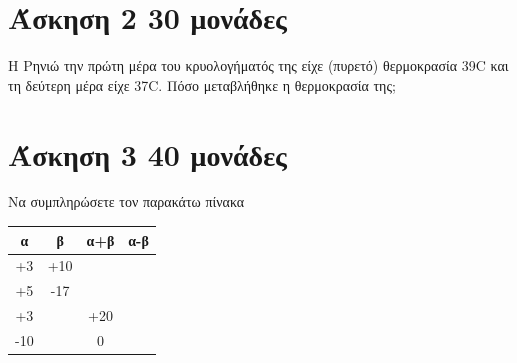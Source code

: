 \documentclass[a4paper,10pt]{report}
\begin{document}
\section*{Άσκηση 2  \hfill \small{30 μονάδες}}
Η Ρηνιώ την πρώτη μέρα του κρυολογήματός της είχε (πυρετό) θερμοκρασία 39\textdegree C και τη δεύτερη μέρα είχε 37\textdegree C. 
Πόσο μεταβλήθηκε η θερμοκρασία της;



\section*{Άσκηση 3 \hfill \small{40 μονάδες}}
Να συμπληρώσετε τον παρακάτω πίνακα
\begin{center}
 \begin{tabular}{|c|c|c|c|}\hline 
   \textbf{α}    & \textbf{β} &         \textbf{α+β}  & \textbf{α-β}            \\
\hline 
   +3& +10 &     &           \\
\hline 
  +5 & -17 &     &           \\
\hline 
+3&        & +20 &           \\
\hline 
-10&   &0  &    \\
\hline
\end{tabular}
\end{center}
\end{document}
